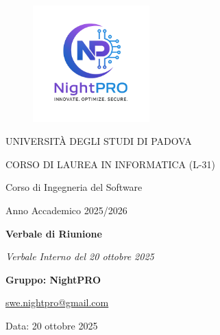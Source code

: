 \documentclass[a4paper, 11pt, oneside]{scrartcl} %
\begin{document}
\thispagestyle{empty}
\begin{titlepage}
    \centering
    
\begin{figure}
    \centering
    \includegraphics[width=0.4\textwidth]{logo.png}
\end{figure}

    \vfill
    
    {\small UNIVERSITÀ DEGLI STUDI DI PADOVA \par}
    {\small CORSO DI LAUREA IN INFORMATICA (L-31) \par}
    \vspace{0.5cm}
    {\large Corso di Ingegneria del Software \par}
    {\small Anno Accademico 2025/2026 \par}


    
    \vfill
    
    {\Huge \bfseries Verbale di Riunione \par}
    
    \vspace{1cm}
    
    {\Large \itshape Verbale Interno del 20 ottobre 2025 \par} 
    
    \vfill
    
    {\Large \bfseries Gruppo: NightPRO \par}
    \vspace{0.5cm}
    {\large \href{mailto:swe.nightpro@gmail.com}{swe.nightpro@gmail.com} \par}
    
    \vfill
    
    {\large Data: 20 ottobre 2025 \par}

\end{titlepage}
\end{document}
